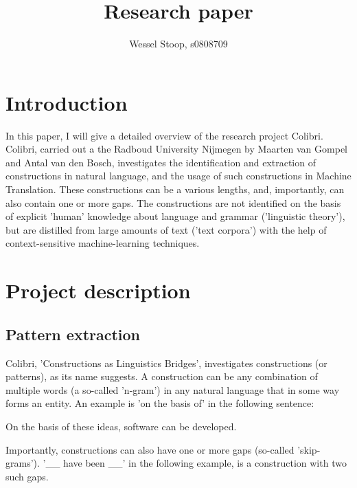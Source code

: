 \documentclass[12pt]{article}
\title{Research paper}
\author{Wessel Stoop, s0808709}
\begin{document}
\maketitle

\section{Introduction}

In this paper, I will give a detailed overview of the research project Colibri. Colibri, carried out a the Radboud University Nijmegen by Maarten van Gompel and Antal van den Bosch, investigates the identification and extraction of constructions in natural language, and the usage of such constructions in Machine Translation. These constructions can be a various lengths, and, importantly, can also contain one or more gaps. The constructions are not identified on the basis of explicit 'human' knowledge about language and grammar ('linguistic theory'), but are distilled from large amounts of text ('text corpora') with the help of context-sensitive machine-learning techniques. 

\section{Project description}


\subsection{Pattern extraction}

Colibri, 'Constructions as Linguistics Bridges', investigates constructions (or patterns), as its name suggests. A construction can be any combination of multiple words (a so-called 'n-gram') in any natural language that in some way forms an entity. An example is 'on the basis of' in the following sentence:

\begin{examples}
\item On the basis of these ideas, software can be developed.
\end{examples}

Importantly, constructions can also have one or more gaps (so-called 'skip-grams'). '\_\_ have been \_\_' in the following example, is a construction with two such gaps. 
\end{document}
